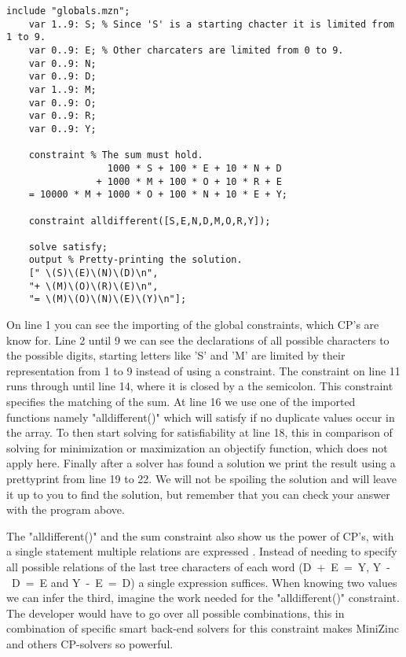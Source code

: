 \label{lst:SendMoreMoney}
\begin{lstlisting}[language=minizinc, caption={Solution to the puzzle "send more money" slightly modified from \url{https://www.minizinc.org/doc-2.5.5/en/downloads/send-more-money.mzn}}]
	include "globals.mzn";
	var 1..9: S; % Since 'S' is a starting chacter it is limited from 1 to 9.
	var 0..9: E; % Other charcaters are limited from 0 to 9.
	var 0..9: N;
	var 0..9: D;
	var 1..9: M;
	var 0..9: O;
	var 0..9: R;
	var 0..9: Y;
	
	constraint % The sum must hold.
	              1000 * S + 100 * E + 10 * N + D
	            + 1000 * M + 100 * O + 10 * R + E
	= 10000 * M + 1000 * O + 100 * N + 10 * E + Y;
	
	constraint alldifferent([S,E,N,D,M,O,R,Y]);
	
	solve satisfy;
	output % Pretty-printing the solution.
	[" \(S)\(E)\(N)\(D)\n",
	"+ \(M)\(O)\(R)\(E)\n",
	"= \(M)\(O)\(N)\(E)\(Y)\n"];
\end{lstlisting}
\label{sendMoreMoneyExplanation}
On line 1 you can see the importing of the global constraints, which CP's are know for. Line 2 until 9 we can see the declarations of all possible characters to the possible digits, starting letters like 'S' and 'M' are limited by their representation from 1 to 9 instead of using a constraint. The constraint on line 11 runs through until line 14, where it is closed by a the semicolon. This constraint specifies the matching of the sum. At line 16 we use one of the imported functions namely "alldifferent()" which will satisfy if no duplicate values occur in the array. To then start solving for satisfiability at line 18, this in comparison of solving for minimization or maximization an objectify function, which does not apply here. Finally after a solver has found a solution we print the result using a prettyprint from line 19 to 22.
We will not be spoiling the solution and will leave it up to you to find the solution, but remember that you can check your answer with the program above.

The "alldifferent()" and the sum constraint also show us the power of CP's, with a single statement multiple relations are expressed \cite{53marriott1998programming}. Instead of needing to specify all possible relations of the last tree characters of each word (\mbox{D + E = Y}, \mbox{Y - D = E} and \mbox{Y - E = D}) a single expression suffices. When knowing two values we can infer the third, imagine the work needed for the "alldifferent()" constraint. The developer would have to go over all possible combinations, this in combination of specific smart back-end solvers for this constraint makes MiniZinc and others CP-solvers so powerful. 

